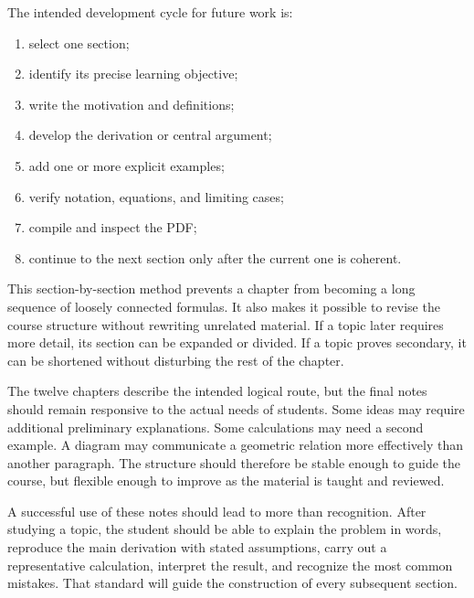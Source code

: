 The intended development cycle for future work is:

\begin{enumerate}
    \item select one section;
    \item identify its precise learning objective;
    \item write the motivation and definitions;
    \item develop the derivation or central argument;
    \item add one or more explicit examples;
    \item verify notation, equations, and limiting cases;
    \item compile and inspect the PDF;
    \item continue to the next section only after the current one is coherent.
\end{enumerate}

This section-by-section method prevents a chapter from becoming a long sequence of loosely connected formulas. It also makes it possible to revise the course structure without rewriting unrelated material. If a topic later requires more detail, its section can be expanded or divided. If a topic proves secondary, it can be shortened without disturbing the rest of the chapter.

The twelve chapters describe the intended logical route, but the final notes should remain responsive to the actual needs of students. Some ideas may require additional preliminary explanations. Some calculations may need a second example. A diagram may communicate a geometric relation more effectively than another paragraph. The structure should therefore be stable enough to guide the course, but flexible enough to improve as the material is taught and reviewed.

A successful use of these notes should lead to more than recognition. After studying a topic, the student should be able to explain the problem in words, reproduce the main derivation with stated assumptions, carry out a representative calculation, interpret the result, and recognize the most common mistakes. That standard will guide the construction of every subsequent section.
